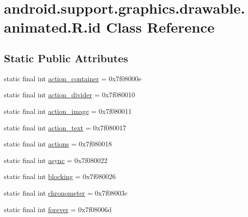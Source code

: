 \hypertarget{classandroid_1_1support_1_1graphics_1_1drawable_1_1animated_1_1R_1_1id}{}\section{android.\+support.\+graphics.\+drawable.\+animated.\+R.\+id Class Reference}
\label{classandroid_1_1support_1_1graphics_1_1drawable_1_1animated_1_1R_1_1id}
\subsection*{Static Public Attributes}
\begin{DoxyCompactItemize}
\item 
static final int \mbox{\hyperlink{classandroid_1_1support_1_1graphics_1_1drawable_1_1animated_1_1R_1_1id_ad3a8b5e39a6727f8720761828138ad36}{action\+\_\+container}} = 0x7f08000e
\item 
static final int \mbox{\hyperlink{classandroid_1_1support_1_1graphics_1_1drawable_1_1animated_1_1R_1_1id_a4af26dc65a6b402ba33678a7f89d8d5f}{action\+\_\+divider}} = 0x7f080010
\item 
static final int \mbox{\hyperlink{classandroid_1_1support_1_1graphics_1_1drawable_1_1animated_1_1R_1_1id_a863126afa0357acc99cddb49182f4bfe}{action\+\_\+image}} = 0x7f080011
\item 
static final int \mbox{\hyperlink{classandroid_1_1support_1_1graphics_1_1drawable_1_1animated_1_1R_1_1id_af05367c558932061cceefe3714a9a7c2}{action\+\_\+text}} = 0x7f080017
\item 
static final int \mbox{\hyperlink{classandroid_1_1support_1_1graphics_1_1drawable_1_1animated_1_1R_1_1id_a9364b1d2e05fccd3dc7b3a7e37805370}{actions}} = 0x7f080018
\item 
static final int \mbox{\hyperlink{classandroid_1_1support_1_1graphics_1_1drawable_1_1animated_1_1R_1_1id_aaf83309e2e73f818a1fbebb84bd5926d}{async}} = 0x7f080022
\item 
static final int \mbox{\hyperlink{classandroid_1_1support_1_1graphics_1_1drawable_1_1animated_1_1R_1_1id_a4b3c8c9b4c312a1f8cf398460635f01f}{blocking}} = 0x7f080026
\item 
static final int \mbox{\hyperlink{classandroid_1_1support_1_1graphics_1_1drawable_1_1animated_1_1R_1_1id_a57c4a9260d9b490170f2179498e023cc}{chronometer}} = 0x7f08003c
\item 
static final int \mbox{\hyperlink{classandroid_1_1support_1_1graphics_1_1drawable_1_1animated_1_1R_1_1id_a7f28a92791f1cb38de1efdc997a07629}{forever}} = 0x7f08006d

\end{DoxyCompactItemize}
